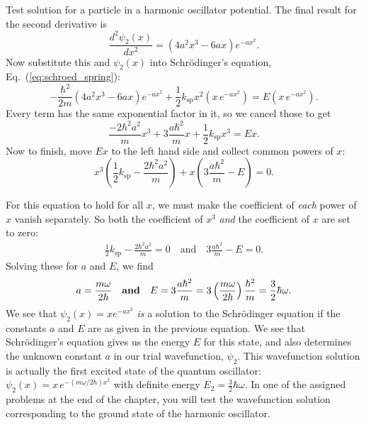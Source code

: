 \begin{example}{Test solution for a particle in a harmonic oscillator potential.}
The final result for the second derivative is
\begin{equation}
\label{eq:2ndDerivative}
\frac{d^2 \psi_2(x)}{dx^2} = \left(4 a^2 x^3 - 6 a x \right) e^{- a x^2}.
\end{equation}
Now substitute this and $\psi_2(x)$ into Schr\"odinger's equation,
Eq.~(\ref{eq:schroed_spring}):
\begin{equation}
-\frac{\hbar^2}{2m}\left(4a^2x^3 - 6ax\right) e^{-ax^2}
+\frac{1}{2}k_\text{sp}x^2\left(x \,e^{-ax^2}\right) = E\left(x \,e^{-ax^2}\right) .
\end{equation}
Every term has the same exponential factor in it, so we cancel those
to get
\begin{equation}
\frac{-2\hbar^2a^2}{m}x^3 + 3\frac{a\hbar^2}{m}x + \frac{1}{2}k_\text{sp}x^3
= Ex .
\end{equation}
Now to finish, move $Ex$ to the left hand side and collect common
powers of $x$:
\begin{equation}
x^3\left(\frac{1}{2}k_\text{sp} - \frac{2\hbar^2a^2}{m}\right)
+ x\left(3\frac{a\hbar^2}{m} - E\right) = 0.
\end{equation}

For this equation to hold for all $x$, we must make the coefficient of 
\textit{each} power of $x$ vanish separately.  So both the coefficient 
of $x^3$ \textit{and} the coefficient of $x$ are set to zero:
\begin{align}
\frac{1}{2}k_\text{sp} - \frac{2\hbar^2a^2}{m} = 0 \quad \text{and} \quad 
3\frac{a\hbar^2}{m} - E = 0.
\end{align}
Solving these for $a$ and $E$, we find
\begin{equation}
a = \frac{m\omega}{2\hbar} \quad 
\mbox{\bf and} \quad E = 3\frac{a\hbar^2}{m}
   = 3\left(\frac{m\omega}{2\hbar}\right)\frac{\hbar^2}{m} 
   = \frac{3}{2}\hbar\omega .
\end{equation}
We see that $\psi_2(x) = x e^{-ax^2}$ \textit{is} a solution to the
Schr\"odinger equation if the constants $a$ and $E$ are as given in
the previous equation.  We see that Schr\"odinger's equation gives
us the energy $E$ for this state, and also determines the unknown
constant $a$ in our trial wavefunction, $\psi_2$.  This wavefunction
solution is actually the first excited state of the quantum oscillator:
$\psi_2(x) = x\,e^{-(m\omega/2\hbar)x^2}$ with definite energy $E_2 =
\frac{3}{2}\hbar\omega$.  In one of the assigned problems at the end of
the chapter, you will test the wavefunction solution corresponding to
the ground state of the harmonic oscillator.
\end{example}

